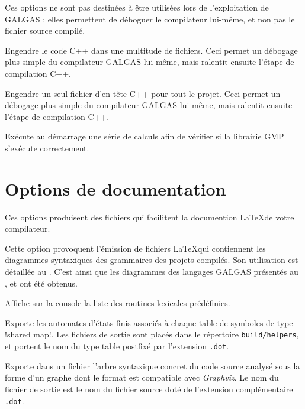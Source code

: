 Ces options ne sont pas destinées à être utilisées lors de l'exploitation de GALGAS : elles permettent de déboguer le compilateur lui-même, et non pas le fichier source compilé.



 Engendre le code C++ dans une multitude de fichiers. Ceci permet un débogage plus simple du compilateur GALGAS lui-même, mais ralentit ensuite l'étape de compilation C++.


 Engendre un seul fichier d'en-tête C++ pour tout le projet. Ceci permet un débogage plus simple du compilateur GALGAS lui-même, mais ralentit ensuite l'étape de compilation C++.


 Exécute au démarrage une série de calculs afin de vérifier si la librairie GMP s'exécute correctement.





\section{Options de documentation}

Ces options produisent des fichiers qui facilitent la documention \LaTeX de votre compilateur.

 Cette option provoquent l'émission de fichiers \LaTeX qui contiennent les diagrammes syntaxiques des grammaires des projets compilés. Son utilisation est détaillée au . C'est ainsi que les diagrammes des langages GALGAS présentés au ,  et  ont été obtenus.





 Affiche sur la console la liste des routines lexicales prédéfinies.




 Exporte les automates d'états finis associés à chaque table de symboles de type \ggs!shared map!. Les fichiers de sortie sont placés dans le répertoire \texttt{build/helpers}, et portent le nom du type table postfixé par l'extension \texttt{.dot}.





 Exporte dans un fichier l'arbre syntaxique concret du code source analysé sous la forme d'un graphe dont le format est compatible avec \emph{Graphviz}. Le nom du fichier de sortie est le nom du fichier source doté de l'extension complémentaire \texttt{.dot}.


